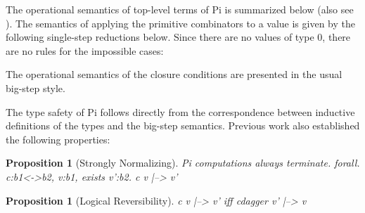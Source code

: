 \documentclass[preprint]{sigplanconf}
\newtheorem{proposition}[theorem]{Proposition}
\begin{document}
The operational semantics of top-level terms of {{Pi}} is summarized below
(also see \cite{infeffects}).  The semantics of applying the primitive
combinators to a value is given by the following single-step reductions below.
Since there are no values of type {{0}}, there are no rules for the impossible
cases:
\begin{scriptsize}
\end{scriptsize}
The operational semantics of the closure conditions are presented in
the usual big-step style.
\begin{scriptsize}
%
%
%
\end{scriptsize}

The type safety of {{Pi}} follows directly from the correspondence
between inductive definitions of the types and the big-step
semantics. Previous work also established the following properties:

\begin{proposition}[Strongly Normalizing]
\label{prop:termination-pi} 
{{Pi}} computations always terminate.  
{{forall. c:b1<->b2, v:b1, exists v':b2.}}  
{{c v |--> v'}}
\end{proposition}

\begin{proposition}[Logical Reversibility]
\label{prop:logrev}
{{c v |--> v'}} iff 
{{ c{dagger} v' |--> v}}
\end{proposition}
\end{document}
